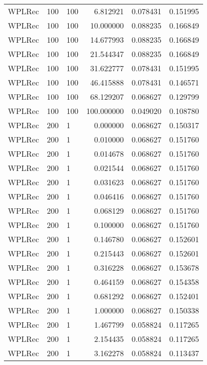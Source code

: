\begin{tabular}{lllrrr}
 WPLRec &  100 &    100 &    6.812921 &     0.078431 &  0.151995 \\
 WPLRec &  100 &    100 &   10.000000 &     0.088235 &  0.166849 \\
 WPLRec &  100 &    100 &   14.677993 &     0.088235 &  0.166849 \\
 WPLRec &  100 &    100 &   21.544347 &     0.088235 &  0.166849 \\
 WPLRec &  100 &    100 &   31.622777 &     0.078431 &  0.151995 \\
 WPLRec &  100 &    100 &   46.415888 &     0.078431 &  0.146571 \\
 WPLRec &  100 &    100 &   68.129207 &     0.068627 &  0.129799 \\
 WPLRec &  100 &    100 &  100.000000 &     0.049020 &  0.108780 \\
 WPLRec &  200 &      1 &    0.000000 &     0.068627 &  0.150317 \\
 WPLRec &  200 &      1 &    0.010000 &     0.068627 &  0.151760 \\
 WPLRec &  200 &      1 &    0.014678 &     0.068627 &  0.151760 \\
 WPLRec &  200 &      1 &    0.021544 &     0.068627 &  0.151760 \\
 WPLRec &  200 &      1 &    0.031623 &     0.068627 &  0.151760 \\
 WPLRec &  200 &      1 &    0.046416 &     0.068627 &  0.151760 \\
 WPLRec &  200 &      1 &    0.068129 &     0.068627 &  0.151760 \\
 WPLRec &  200 &      1 &    0.100000 &     0.068627 &  0.151760 \\
 WPLRec &  200 &      1 &    0.146780 &     0.068627 &  0.152601 \\
 WPLRec &  200 &      1 &    0.215443 &     0.068627 &  0.152601 \\
 WPLRec &  200 &      1 &    0.316228 &     0.068627 &  0.153678 \\
 WPLRec &  200 &      1 &    0.464159 &     0.068627 &  0.154358 \\
 WPLRec &  200 &      1 &    0.681292 &     0.068627 &  0.152401 \\
 WPLRec &  200 &      1 &    1.000000 &     0.068627 &  0.150338 \\
 WPLRec &  200 &      1 &    1.467799 &     0.058824 &  0.117265 \\
 WPLRec &  200 &      1 &    2.154435 &     0.058824 &  0.117265 \\
 WPLRec &  200 &      1 &    3.162278 &     0.058824 &  0.113437 \\

\end{tabular}
